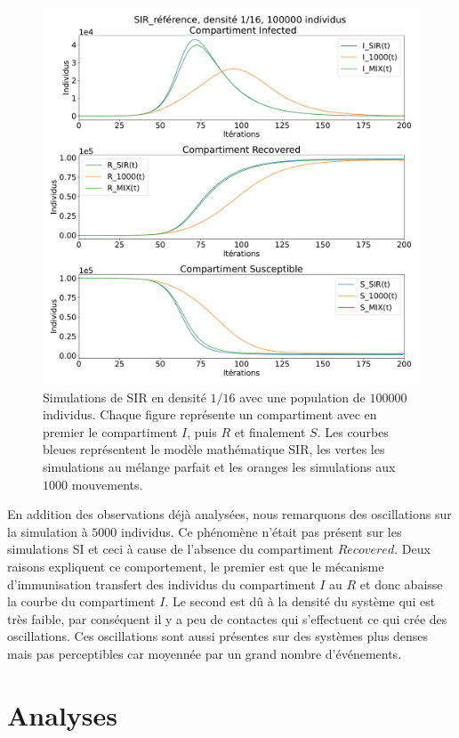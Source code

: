\newpage

\begin{figure}[h]
	\centering
	\captionsetup{justification=centering}
	\includegraphics[width=.9\textwidth]{Images/SIR_ref_16_100.pdf}
	\caption[Simulation SIR, densité $1/16$]{Simulations de SIR en densité $1/16$ avec une population de $100000$ individus. Chaque figure représente un compartiment avec en premier le compartiment $I$, puis $R$ et finalement $S$. Les courbes bleues représentent le modèle mathématique SIR, les vertes les simulations au mélange parfait et les oranges les simulations aux $1000$ mouvements.}
\end{figure}

En addition des observations déjà analysées, nous remarquons des oscillations sur la simulation à $5000$ individus. Ce phénomène n'était pas présent sur les simulations SI et ceci à cause de l'absence du compartiment $Recovered$. Deux raisons expliquent ce comportement, le premier est que le mécanisme d'immunisation transfert des individus du compartiment $I$ au $R$ et donc abaisse la courbe du compartiment $I$. Le second est dû à la densité du système qui est très faible, par conséquent il y a peu de contactes qui s'effectuent ce qui crée des oscillations. Ces oscillations sont aussi présentes sur des systèmes plus denses mais pas perceptibles car moyennée par un grand nombre d'événements.

\section{Analyses}

